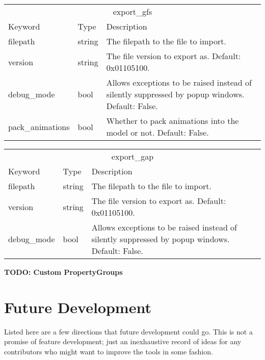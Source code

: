 \documentclass{article}
\begin{document}
\begin{center}
\begin{tabular}{p{}p{}p{}}
\hline
\multicolumn{3}{c}{export\_gfs}\\
Keyword & Type & Description\\
\hline
filepath & string & The filepath to the file to import.\\
version & string & The file version to export as. Default: 0x01105100.\\
debug\_mode & bool & Allows exceptions to be raised instead of silently suppressed by popup windows. Default: False.\\
pack\_animations & bool & Whether to pack animations into the model or not. Default: False.\\
\hline
\end{tabular}
\end{center}

\begin{center}
\begin{tabular}{p{}p{}p{}}
\hline
\multicolumn{3}{c}{export\_gap}\\
Keyword & Type & Description\\
\hline
filepath & string & The filepath to the file to import.\\
version & string & The file version to export as. Default: 0x01105100.\\
debug\_mode & bool & Allows exceptions to be raised instead of silently suppressed by popup windows. Default: False.\\
\hline
\end{tabular}
\end{center}

\textbf{TODO: Custom PropertyGroups}
\clearpage

\section{Future Development}
Listed here are a few directions that future development could go. This is not a promise of feature development; just an inexhaustive record of ideas for any contributors who might want to improve the tools in some fashion.
\end{document}
